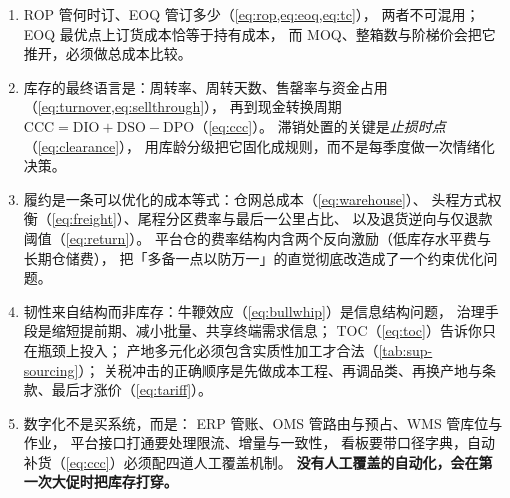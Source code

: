 \begin{keypoint}[本章要点回顾]
\begin{enumerate}
        提高服务水平是有价格的（\cref{eq:zservice}）：
        从 95\% 到 99\%，库存涨四成而缺货只少四个百分点，
        是否值得\emph{完全取决于缺货成本的大小}，所以服务水平必须按 SKU 分层设置。
  \item ROP 管何时订、EOQ 管订多少（\cref{eq:rop,eq:eoq,eq:tc}），
        两者不可混用；EOQ 最优点上订货成本恰等于持有成本，
        而 MOQ、整箱数与阶梯价会把它推开，必须做总成本比较。
  \item 库存的最终语言是：周转率、周转天数、售罄率与资金占用（\cref{eq:turnover,eq:sellthrough}），
        再到现金转换周期 $\text{CCC} = \text{DIO} + \text{DSO} - \text{DPO}$（\cref{eq:ccc}）。
        滞销处置的关键是\emph{止损时点}（\cref{eq:clearance}），
        用库龄分级把它固化成规则，而不是每季度做一次情绪化决策。
  \item 履约是一条可以优化的成本等式：仓网总成本（\cref{eq:warehouse}）、
        头程方式权衡（\cref{eq:freight}）、尾程分区费率与最后一公里占比、
        以及退货逆向与仅退款阈值（\cref{eq:return}）。
        平台仓的费率结构内含两个反向激励（低库存水平费与长期仓储费），
        把「多备一点以防万一」的直觉彻底改造成了一个约束优化问题。
  \item 韧性来自结构而非库存：牛鞭效应（\cref{eq:bullwhip}）是信息结构问题，
        治理手段是缩短提前期、减小批量、共享终端需求信息；
        TOC（\cref{eq:toc}）告诉你只在瓶颈上投入；
        产地多元化必须包含实质性加工才合法（\cref{tab:sup-sourcing}）；
        关税冲击的正确顺序是先做成本工程、再调品类、再换产地与条款、最后才涨价（\cref{eq:tariff}）。
  \item 数字化不是买系统，而是：
        ERP 管账、OMS 管路由与预占、WMS 管库位与作业，
        平台接口打通要处理限流、增量与一致性，
        看板要带口径字典，自动补货（\cref{eq:ccc}）必须配四道人工覆盖机制。
        \textbf{没有人工覆盖的自动化，会在第一次大促时把库存打穿。}
\end{enumerate}
\end{keypoint}

